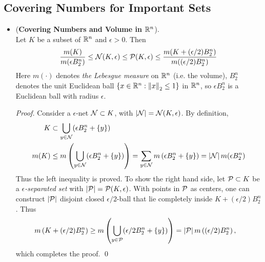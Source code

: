 \documentclass[11pt]{article}
\begin{document}
\subsection{Covering Numbers for Important Sets}
\begin{itemize}
\item \begin{theorem} (\textbf{Covering Numbers and Volume in ${\mathbb R}^n$}). \citep{vershynin2018high}\\
Let $K$ be a subset of ${\mathbb R}^n$ and  $\epsilon > 0$. Then
\begin{align}
\frac{m(K)}{m(\epsilon B_2^n)} \le {\mathcal N}(K, \epsilon) \le {\mathcal P}(K, \epsilon) \le \frac{m(K + (\epsilon/2) B_2^n)}{m((\epsilon/2) B_2^n)}  \label{ineqn: cover_num_vol_rn}
\end{align}
Here $m(\cdot)$ denotes \emph{the Lebesgue measure} on ${\mathbb R}^n$ (i.e. the volume), $B_2^n$ denotes the unit Euclidean ball $\left\{x \in {\mathbb R}^n: \left\|x\right\|_{2} \le 1\right\}$ in ${\mathbb R}^n$, so $\epsilon B_2^n$  is a Euclidean ball with radius $\epsilon$.
\end{theorem}
\begin{proof}
Consider a $\epsilon$-net ${\mathcal N} \subset K$, with $\left\lvert {\mathcal N} \right\rvert = {\mathcal N}(K, \epsilon)$. By definition, 
\begin{align*}
K &\subset \bigcup_{y \in {\mathcal N}}(\epsilon B_2^n+\left\{y\right\}) \\
m(K) &\le m\left(\bigcup_{y \in {\mathcal N}}(\epsilon B_2^n+\left\{y\right\})\right) = \sum_{y \in {\mathcal N}}m\left(\epsilon B_2^n+\left\{y\right\}\right) = \left\lvert {\mathcal N} \right\rvert m(\epsilon B_2^n)
\end{align*} Thus the left inequality is proved. To show the right hand side, let ${\mathcal P} \subset K$ be a \emph{$\epsilon$-separated set} with $\left\lvert {\mathcal P} \right\rvert = {\mathcal P}(K, \epsilon)$. With points in ${\mathcal P}$ as centers, one can construct  $\left\lvert {\mathcal P} \right\rvert$ disjoint closed $\epsilon/2$-ball that lie completely inside $K + (\epsilon/2) B_2^n$. Thus
\begin{align*}
m\left(K + (\epsilon/2) B_2^n\right) &\ge m\left(\bigcup_{y \in {\mathcal P}}(\epsilon/2 B_2^n+\left\{y\right\})\right) = \left\lvert {\mathcal P} \right\rvert m\left((\epsilon/2) B_2^n\right),
\end{align*} which completes the proof. \qed
\end{proof}


\end{itemize}
\end{document}
